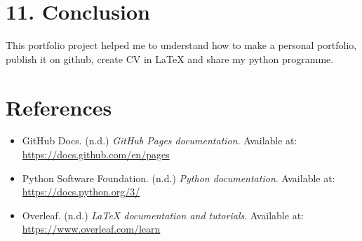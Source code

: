 \documentclass[12pt,a4paper]{article}
\begin{document}
\section{11. Conclusion}

This portfolio project helped me to understand how to make a personal portfolio, publish it on github, create CV in LaTeX and share my python programme.

\section{References}

\begin{itemize}
    \item GitHub Docs. (n.d.) \textit{GitHub Pages documentation}. Available at: \url{https://docs.github.com/en/pages}

    \item Python Software Foundation. (n.d.) \textit{Python documentation}. Available at: \url{https://docs.python.org/3/}

    \item Overleaf. (n.d.) \textit{LaTeX documentation and tutorials}. Available at: \url{https://www.overleaf.com/learn}
    \end{itemize}
\end{document}
